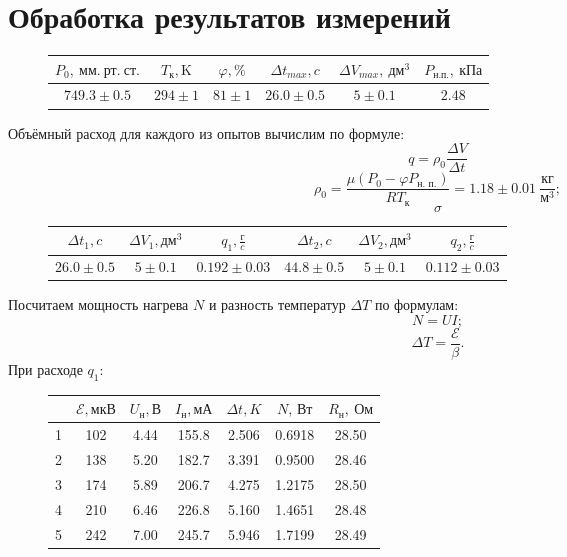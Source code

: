 \documentclass[a4paper, fontsize=14pt]{article}
\begin{document}
\section*{Обработка результатов измерений}
\begin{figure}[H]
\center

\begin{tabular}{|c|c|c|c|c|c|}
\hline $P_0,\ \text{мм}.\ \text{рт}.\ \text{ст}. $ & $T_{\text{к}}, \text{K}$ & $\varphi, \%$ & $\Delta t_{max}, c$ & $\Delta V_{max},\ \text{дм}^3$ & $P_{\text{н.п.}},\ \text{кПа}$ \\\hline
 $749.3 \pm 0.5$ & $294 \pm 1$ & $81 \pm 1$ & $26.0 \pm 0.5$ & $5 \pm 0.1$ & $2.48$ \\\hline
\end{tabular}
\end{figure}
Объёмный расход для каждого из опытов вычислим по формуле:
\[
	q = \rho_0 \frac{\Delta V}{\Delta t}
\]
\[
	\rho_0 = \frac{\mu \left(P_0 - \varphi P_{\text{н. п.}} \right)}{RT_\text{к}} = 1.18 \pm 0.01\ \frac{\text{кг}}{\text{м}^3};
\]
\[
	\sigma
\]

\begin{figure}[H]
\center
\begin{tabular}{|c|c|c|c|c|c|}
\hline $\Delta t_1, c$ & $\Delta V_1, \text{дм}^3$ & $q_1, \frac{\text{г}}{c}$ & $\Delta t_2, c$ & $\Delta V_2, \text{дм}^3$ & $q_2, \frac{\text{г}}{c}$ \\\hline
 $26.0 \pm 0.5$ & $5 \pm 0.1$ & $0.192 \pm 0.03$ & $44.8 \pm 0.5$ & $5 \pm 0.1$ & $0.112 \pm 0.03$ \\\hline
\end{tabular}
\end{figure}

Посчитаем мощность нагрева $N$ и разность температур $\Delta T$ по формулам:
\[
	N = UI;
\]
\[
	\Delta T = \frac{\mathcal{E}}{\beta}.
\]
При расходе $q_1$:
\begin{figure}[H]
\center
\begin{tabular}{|c|c|c|c|c|c|c|}\hline
{} &   $\mathcal{E}, \text{мкВ}$ & $U_\text{н}, \text{В}$ & $I_\text{н}, \text{мА}$ & $\Delta t, K$ & $N,\, \text{Вт}$ & $R_\text{н},\ \text{Ом}$ \\\hline
1 &  102 &  4.44 &  155.8 &  2.506 &  0.6918 &  28.50 \\\hline
2 &  138 &  5.20 &  182.7 &  3.391 &  0.9500 &  28.46 \\\hline
3 &  174 &  5.89 &  206.7 &  4.275 &  1.2175 &  28.50 \\\hline
4 &  210 &  6.46 &  226.8 &  5.160 &  1.4651 &  28.48 \\\hline
5 &  242 &  7.00 &  245.7 &  5.946 &  1.7199 &  28.49 \\\hline
\end{tabular}
\end{figure}
\end{document}
